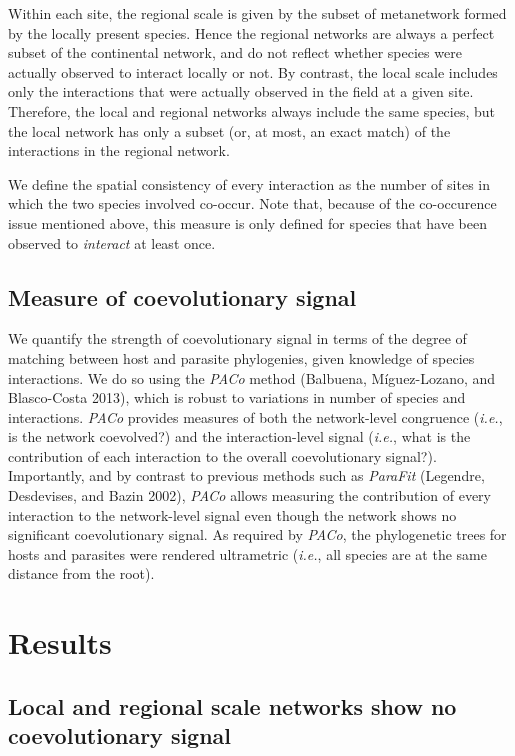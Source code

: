 \documentclass[12pt]{article}
\begin{document}
Within each site, the regional scale is given by the subset of
metanetwork formed by the locally present species. Hence the regional
networks are always a perfect subset of the continental network, and do
not reflect whether species were actually observed to interact locally
or not. By contrast, the local scale includes only the interactions that
were actually observed in the field at a given site. Therefore, the
local and regional networks always include the same species, but the
local network has only a subset (or, at most, an exact match) of the
interactions in the regional network.

We define the spatial consistency of every interaction as the number of
sites in which the two species involved co-occur. Note that, because of
the co-occurence issue mentioned above, this measure is only defined for
species that have been observed to \emph{interact} at least once.

\subsection{Measure of coevolutionary
signal}\label{measure-of-coevolutionary-signal}

We quantify the strength of coevolutionary signal in terms of the degree
of matching between host and parasite phylogenies, given knowledge of
species interactions. We do so using the \emph{PACo} method (Balbuena,
M{í}guez-Lozano, and Blasco-Costa 2013), which is robust to variations
in number of species and interactions. \emph{PACo} provides measures of
both the network-level congruence (\emph{i.e.}, is the network
coevolved?) and the interaction-level signal (\emph{i.e.}, what is the
contribution of each interaction to the overall coevolutionary signal?).
Importantly, and by contrast to previous methods such as \emph{ParaFit}
(Legendre, Desdevises, and Bazin 2002), \emph{PACo} allows measuring the
contribution of every interaction to the network-level signal even
though the network shows no significant coevolutionary signal. As
required by \emph{PACo}, the phylogenetic trees for hosts and parasites
were rendered ultrametric (\emph{i.e.}, all species are at the same
distance from the root).

\section{Results}\label{results}

\subsection{Local and regional scale networks show no coevolutionary
signal}\label{local-and-regional-scale-networks-show-no-coevolutionary-signal}
\end{document}
